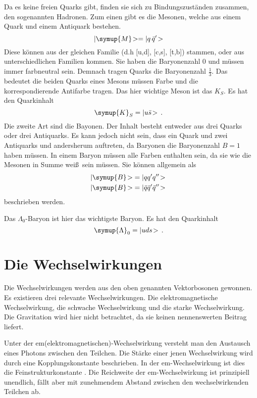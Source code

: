 Da es keine freien Quarks gibt, finden sie sich zu
Bindungszust\"anden zusammen, den sogenannten Hadronen.
Zum einen gibt es die Mesonen, welche aus einem Quark und
einem Antiquark bestehen.
\begin{equation}
	|\symup{M}\!> = | q\, \bar{q}'\!>
\end{equation}
Diese k\"onnen aus der gleichen Familie (d.h [u,d], [c,s], [t,b])
stammen,
oder aus unterschiedlichen Familien kommen.
Sie haben die Baryonenzahl 0 und m\"ussen immer farbneutral sein.
Demnach tragen Quarks die Baryonenzahl $\frac{1}{3}$.
Das bedeutet die beiden Quarks eines Mesons m\"ussen Farbe und die
korrespondierende Antifarbe tragen.
Das hier wichtige Meson ist das $K_S$. Es hat den Quarkinhalt
\begin{equation}
\symup{K}_S = |u \bar{s}\!>\,.
\end{equation}
Die zweite Art sind die Bayonen.
Der Inhalt besteht entweder aus drei Quarks oder drei Antiquarks.
Es kann jedoch nicht sein, dass ein Quark und zwei
Antiquarks und andersherum auftreten, da Baryonen
die Baryonenzahl $B = 1$ haben m\"ussen.
In einem Baryon m\"ussen alle Farben enthalten sein, da sie wie die
Mesonen in Summe wei\ss\, sein m\"ussen.
Sie k\"onnen allgemein als
\begin{align}
	|\symup{B}\!> &= |q q' q''\!> \\
	|\symup{B}\!> &= |\bar{q} \bar{q}' \bar{q}''\!> \,
\end{align}
beschrieben werden.

Das $\Lambda_{0}$-Baryon ist hier das wichtigste Baryon. Es
hat den Quarkinhalt
\begin{equation}
\symup{\Lambda}_0 = |u d s\!>\,.
\end{equation}

\section{Die Wechselwirkungen}
Die Wechselwirkungen werden aus den oben genannten Vektorbosonen gewonnen.
Es existieren drei relevante Wechselwirkungen. Die elektromagnetische
Wechselwirkung, die schwache Wechselwirkung und die starke
Wechselwirkung. Die Gravitation wird hier nicht betrachtet, da sie keinen
nennenswerten Beitrag liefert.

Unter der em(elektromagnetischen)-Wechselwirkung versteht
man den Austausch eines Photons zwischen den Teilchen.
Die St\"arke einer jenen Wechselwirkung wird durch eine
Kopplungskonstante beschrieben. In der em-Wechselwirkung ist
dies die Feinstrukturkonstante \cite{alphas}.
Die Reichweite der em-Wechselwirkung ist prinzipiell unendlich,
f\"allt aber mit zunehmendem Abstand zwischen den
wechselwirkenden Teilchen ab.


